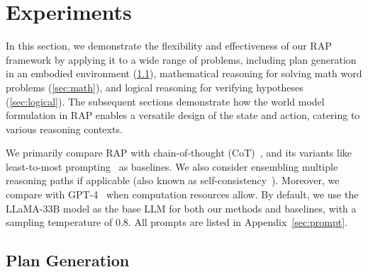 
\section{Experiments} \label{sec:experiments}


In this section, we demonstrate the flexibility and effectiveness of our RAP framework by applying it to a wide range of problems, including plan generation in an embodied environment (\ref{sec:plan}), mathematical reasoning for solving math word problems (\ref{sec:math}), and logical reasoning for verifying hypotheses (\ref{sec:logical}). The subsequent sections demonstrate how the world model formulation in RAP enables a versatile design of the state and action, catering to various reasoning contexts.

We primarily compare RAP with chain-of-thought (CoT)~\cite{wei2022chain}, and its variants like least-to-most prompting~\cite{zhou2022least} as baselines. We also consider ensembling multiple reasoning paths if applicable (also known as self-consistency~\cite{wang2022self}). Moreover, we compare \ours with GPT-4~\cite{openai2023gpt4} when computation resources allow. By default, we use the LLaMA-33B model \cite{touvron2023llama} as the base LLM for both our methods and baselines, with a sampling temperature of 0.8. All prompts are listed in Appendix~\ref{sec:prompt}.


\subsection{Plan Generation} \label{sec:plan}


